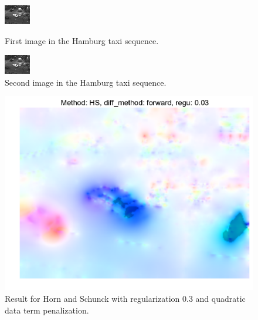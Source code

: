 \begin{figure}
\centering
\begin{minipage}{0.45\textwidth}
\centering
\includegraphics[scale=6]{Figures/taxi-00.eps}
\caption{First image in the Hamburg taxi sequence.}
\label{taxi1}
\end{minipage}\hfill
\begin{minipage}{0.45\textwidth}
\centering
\includegraphics[scale=6]{Figures/taxi-01.eps}
\caption{Second image in the Hamburg taxi sequence.}
\label{taxi2}
\end{minipage}
\end{figure}

\begin{figure}
    \centering
    \includegraphics[scale=0.8]{Figures/HSforward03.pdf}
    \caption{Result for Horn and Schunck with regularization 0.3 and quadratic data term penalization.}
    \label{reguHS}
\end{figure}
%

